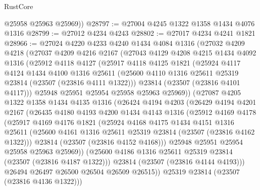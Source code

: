 \begin{lexlean}{RustCore}
\begin{coremodule}
        @25958
        @25963
        @25969))
@28797 := @27004 @4245 @1322 @1358 @1434 @4076 @1316
@28799 := @27012 @4234 @4243
@28802 := @27017 @4234 @4241 @1821
@28966 := @27024
    @4220
    @4233
    @4240
    @1434
    @4084
    @1316
    (@27032
      @4209
      @4218
      (@27037
        @4209
        @4216
        @2167
        (@27043
          @4129
          @4208
          @4215
          @1434
          @4092
          @1316
          (@25912
            @4118
            @4127
            (@25917
              @4118
              @4125
              @1821
              (@25924
                @4117
                @4124
                @1434
                @4100
                @1316
                @25611
                (@25600 @4110 @1316 @25611 @25319 @23814 (@23507 (@23816 @4111 @1322)))
                @23814
                (@23507 (@23816 @4101 @4117)))
              @25948
              @25951
              @25954
              @25958
              @25963
              @25969))
          (@27087
            @4205
            @1322
            @1358
            @1434
            @4135
            @1316
            (@26424
              @4194
              @4203
              (@26429
                @4194
                @4201
                @2167
                (@26435
                  @4180
                  @4193
                  @4200
                  @1434
                  @4143
                  @1316
                  (@25912
                    @4169
                    @4178
                    (@25917
                      @4169
                      @4176
                      @1821
                      (@25924
                        @4168
                        @4175
                        @1434
                        @4151
                        @1316
                        @25611
                        (@25600 @4161 @1316 @25611 @25319 @23814 (@23507 (@23816 @4162 @1322)))
                        @23814
                        (@23507 (@23816 @4152 @4168)))
                      @25948
                      @25951
                      @25954
                      @25958
                      @25963
                      @25969))
                  (@25600 @4186 @1316 @25611 @25319 @23814 (@23507 (@23816 @4187 @1322)))
                  @23814
                  (@23507 (@23816 @4144 @4193)))
                @26494
                @26497
                @26500
                @26504
                @26509
                @26515))
            @25319
            @23814
            (@23507 (@23816 @4136 @1322)))

\end{coremodule}
\end{lexlean}
